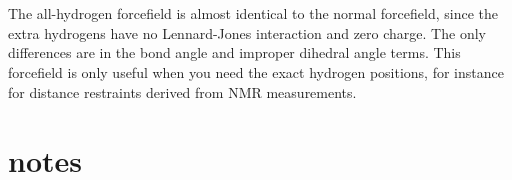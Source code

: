 %
%
%


\section{}
The {\gromacs} all-hydrogen forcefield is almost identical to the normal
{\gromacs} forcefield, since the extra hydrogens have no Lennard-Jones
interaction and zero charge. The only differences are in the bond angle
and improper dihedral angle terms. This forcefield is only useful when
you need the exact hydrogen positions, for instance for distance
restraints derived from NMR measurements.

\section{ notes}

